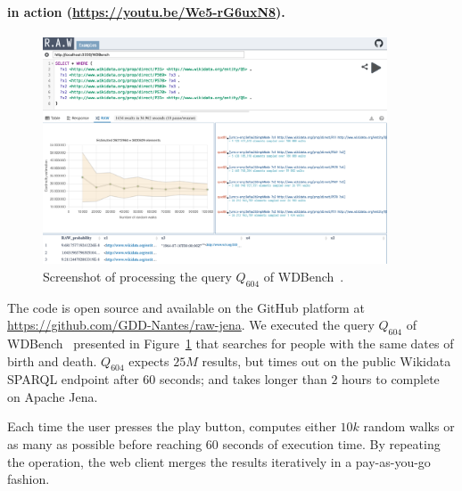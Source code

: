 \paragraph{\NAME in action (\url{https://youtu.be/We5-rG6uxN8}).}


 \begin{figure}
   \centering
   \includegraphics[width=0.91\textwidth]{figures/raw_screenshot.png}
   \caption{\label{fig:raw_screenshot} Screenshot of \NAME processing the query $Q_{604}$ of
     WDBench~\cite{angles2022wdbench}.}
 \end{figure}

The code is open source and available on the GitHub platform at
\url{https://github.com/GDD-Nantes/raw-jena}.  We executed the query
$Q_{604}$ of WDBench~\cite{angles2022wdbench} presented in
Figure~\ref{fig:raw_screenshot} that searches for people with the same
dates of birth and death. $Q_{604}$ expects $25M$ results, but times
out on the public Wikidata SPARQL endpoint after $60$ seconds; and
takes longer than $2$ hours to complete on Apache Jena.


\noindent Each time the user presses the play button, \NAME computes
either $10k$ random walks or as many as possible before reaching $60$
seconds of execution time. By repeating the operation, the web client
merges the results iteratively in a pay-as-you-go fashion.


